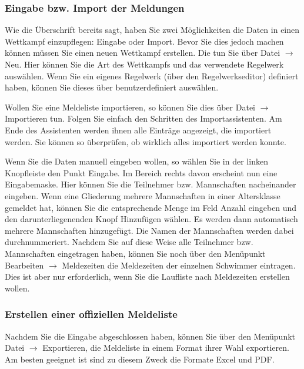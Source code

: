 \documentclass[11pt,a4paper,twoside,ngerman]{article}
\begin{document}
\subsubsection*{Eingabe bzw. Import der Meldungen}
Wie die Überschrift bereits sagt, haben Sie zwei Möglichkeiten die Daten in einen Wettkampf einzupflegen: Eingabe oder Import. Bevor Sie dies jedoch machen können müssen Sie einen neuen Wettkampf erstellen. Die tun Sie über \glqq{}Datei\grqq{} \ensuremath{\rightarrow} \glqq{}Neu\grqq{}. Hier können Sie die Art des Wettkampfs und das verwendete Regelwerk auswählen. Wenn Sie ein eigenes Regelwerk (über den Regelwerkseditor) definiert haben, können Sie dieses über \glqq{}benutzerdefiniert\grqq{} auswählen.

Wollen Sie eine Meldeliste importieren, so können Sie dies über \glqq{}Datei\grqq{} \ensuremath{\rightarrow} \glqq{}Importieren\grqq{} tun. Folgen Sie einfach den Schritten des Importassistenten. Am Ende des Assistenten werden ihnen alle Einträge angezeigt, die importiert werden. Sie können so überprüfen, ob wirklich alles importiert werden konnte.

Wenn Sie die Daten manuell eingeben wollen, so wählen Sie in der linken Knopfleiste den Punkt \glqq{}Eingabe\grqq{}. Im Bereich rechts davon erscheint nun eine Eingabemaske. Hier können Sie die Teilnehmer bzw. Mannschaften nacheinander eingeben. Wenn eine Gliederung mehrere Mannschaften in einer Altersklasse gemeldet hat, können Sie die entsprechende Menge im Feld \glqq{}Anzahl\grqq{} eingeben und den darunterliegenenden Knopf \glqq{}Hinzufügen\grqq{} wählen. Es werden dann automatisch mehrere Mannschaften hinzugefügt. Die Namen der Mannschaften werden dabei durchnummeriert. Nachdem Sie auf diese Weise alle Teilnehmer bzw. Mannschaften eingetragen haben, können Sie noch über den Menüpunkt \glqq{}Bearbeiten\grqq{} \ensuremath{\rightarrow} \glqq{}Meldezeiten\grqq{} die Meldezeiten der einzelnen Schwimmer eintragen. Dies ist aber nur erforderlich, wenn Sie die Laufliste nach Meldezeiten erstellen wollen.


\subsubsection*{Erstellen einer offiziellen Meldeliste}
Nachdem Sie die Eingabe abgeschlossen haben, können Sie über den Menüpunkt \glqq{}Datei\grqq{} \ensuremath{\rightarrow} \glqq{}Exportieren\grqq{}, die Meldeliste in einem Format ihrer Wahl exportieren. Am besten geeignet ist sind zu diesem Zweck die Formate Excel und PDF.
\end{document}
